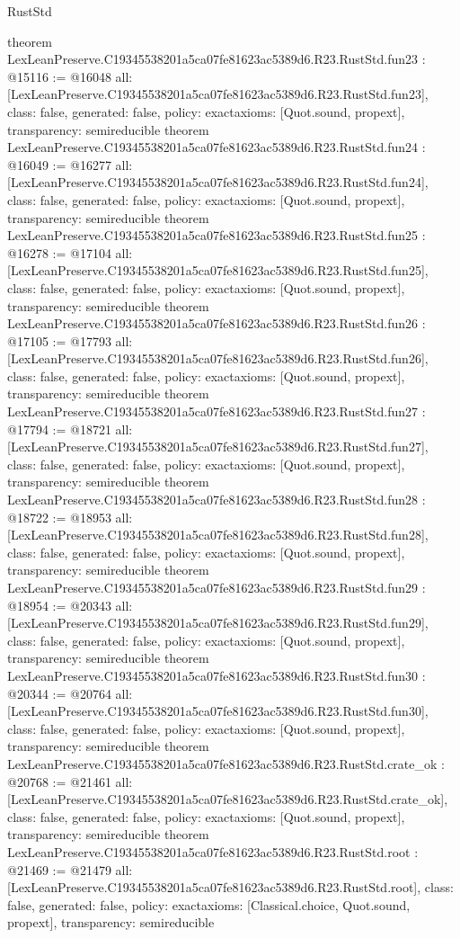 \begin{lexlean}{RustStd}
\begin{coremodule}
{}
theorem LexLeanPreserve.C19345538201a5ca07fe81623ac5389d6.R23.RustStd.fun23 : @15116 := @16048 {
  all: [LexLeanPreserve.C19345538201a5ca07fe81623ac5389d6.R23.RustStd.fun23],
  class: false,
  generated: false,
  policy: exact{axioms: [Quot.sound, propext]},
  transparency: semireducible
}
theorem LexLeanPreserve.C19345538201a5ca07fe81623ac5389d6.R23.RustStd.fun24 : @16049 := @16277 {
  all: [LexLeanPreserve.C19345538201a5ca07fe81623ac5389d6.R23.RustStd.fun24],
  class: false,
  generated: false,
  policy: exact{axioms: [Quot.sound, propext]},
  transparency: semireducible
}
theorem LexLeanPreserve.C19345538201a5ca07fe81623ac5389d6.R23.RustStd.fun25 : @16278 := @17104 {
  all: [LexLeanPreserve.C19345538201a5ca07fe81623ac5389d6.R23.RustStd.fun25],
  class: false,
  generated: false,
  policy: exact{axioms: [Quot.sound, propext]},
  transparency: semireducible
}
theorem LexLeanPreserve.C19345538201a5ca07fe81623ac5389d6.R23.RustStd.fun26 : @17105 := @17793 {
  all: [LexLeanPreserve.C19345538201a5ca07fe81623ac5389d6.R23.RustStd.fun26],
  class: false,
  generated: false,
  policy: exact{axioms: [Quot.sound, propext]},
  transparency: semireducible
}
theorem LexLeanPreserve.C19345538201a5ca07fe81623ac5389d6.R23.RustStd.fun27 : @17794 := @18721 {
  all: [LexLeanPreserve.C19345538201a5ca07fe81623ac5389d6.R23.RustStd.fun27],
  class: false,
  generated: false,
  policy: exact{axioms: [Quot.sound, propext]},
  transparency: semireducible
}
theorem LexLeanPreserve.C19345538201a5ca07fe81623ac5389d6.R23.RustStd.fun28 : @18722 := @18953 {
  all: [LexLeanPreserve.C19345538201a5ca07fe81623ac5389d6.R23.RustStd.fun28],
  class: false,
  generated: false,
  policy: exact{axioms: [Quot.sound, propext]},
  transparency: semireducible
}
theorem LexLeanPreserve.C19345538201a5ca07fe81623ac5389d6.R23.RustStd.fun29 : @18954 := @20343 {
  all: [LexLeanPreserve.C19345538201a5ca07fe81623ac5389d6.R23.RustStd.fun29],
  class: false,
  generated: false,
  policy: exact{axioms: [Quot.sound, propext]},
  transparency: semireducible
}
theorem LexLeanPreserve.C19345538201a5ca07fe81623ac5389d6.R23.RustStd.fun30 : @20344 := @20764 {
  all: [LexLeanPreserve.C19345538201a5ca07fe81623ac5389d6.R23.RustStd.fun30],
  class: false,
  generated: false,
  policy: exact{axioms: [Quot.sound, propext]},
  transparency: semireducible
}
theorem LexLeanPreserve.C19345538201a5ca07fe81623ac5389d6.R23.RustStd.crate_ok : @20768 := @21461 {
  all: [LexLeanPreserve.C19345538201a5ca07fe81623ac5389d6.R23.RustStd.crate_ok],
  class: false,
  generated: false,
  policy: exact{axioms: [Quot.sound, propext]},
  transparency: semireducible
}
theorem LexLeanPreserve.C19345538201a5ca07fe81623ac5389d6.R23.RustStd.root : @21469 := @21479 {
  all: [LexLeanPreserve.C19345538201a5ca07fe81623ac5389d6.R23.RustStd.root],
  class: false,
  generated: false,
  policy: exact{axioms: [Classical.choice, Quot.sound, propext]},
  transparency: semireducible
}


\end{coremodule}
\end{lexlean}
